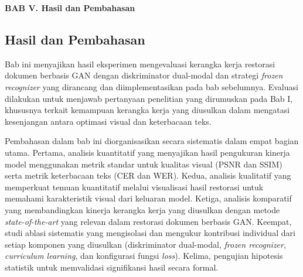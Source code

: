 \documentclass[12pt,a4paper]{article}
\begin{document}
\setcounter{page}{117}


\vspace{2cm}
\begin{center}
{\fontsize{14}{16.8}\selectfont\textbf{BAB V. Hasil dan Pembahasan}}\\[1em]
\end{center}
\label{sec:hasil-dan-pembahasan}
\setcounter{section}{5}
\setcounter{subsection}{0}
\vspace{2em}

\subsection{Hasil dan Pembahasan}
\label{subsec:hasil-pendahuluan}
\vspace{0.8em}

Bab ini menyajikan hasil eksperimen mengevaluasi kerangka kerja restorasi dokumen berbasis GAN dengan diskriminator dual-modal dan strategi \textit{frozen recognizer} yang dirancang dan diimplementasikan pada bab sebelumnya. Evaluasi dilakukan untuk menjawab pertanyaan penelitian yang dirumuskan pada Bab I, khususnya terkait kemampuan kerangka kerja yang diusulkan dalam mengatasi kesenjangan antara optimasi visual dan keterbacaan teks.

\vspace{0.8em}

Pembahasan dalam bab ini diorganisasikan secara sistematis dalam empat bagian utama. Pertama, analisis kuantitatif yang menyajikan hasil pengukuran kinerja model menggunakan metrik standar untuk kualitas visual (PSNR dan SSIM) serta metrik keterbacaan teks (CER dan WER). Kedua, analisis kualitatif yang memperkuat temuan kuantitatif melalui visualisasi hasil restorasi untuk memahami karakteristik visual dari keluaran model. Ketiga, analisis komparatif yang membandingkan kinerja kerangka kerja yang diusulkan dengan metode \textit{state-of-the-art} yang relevan dalam restorasi dokumen berbasis GAN. Keempat, studi ablasi sistematis yang mengisolasi dan mengukur kontribusi individual dari setiap komponen yang diusulkan (diskriminator dual-modal, \textit{frozen recognizer}, \textit{curriculum learning}, dan konfigurasi fungsi \textit{loss}). Kelima, pengujian hipotesis statistik untuk memvalidasi signifikansi hasil secara formal.
\end{document}
